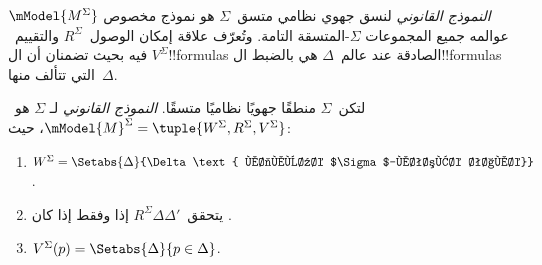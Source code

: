 \documentclass[../../../include/open-logic-section]{subfiles}
\begin{document}


\emph{النموذج القانوني} لنسق جهوي نظامي متسق~$\Sigma$ هو نموذج مخصوص
$\mModel{M^\Sigma}$ عوالمه جميع المجموعات $\Sigma$-المتسقة التامة.
وتُعرّف علاقة إمكان الوصول~$R^\Sigma$ والتقييم~$V^\Sigma$ فيه بحيث
تضمنان أن ال!!{formula}s الصادقة عند عالم~$\Delta$ هي بالضبط
ال!!{formula}s التي تتألف منها~$\Delta$.

\begin{defn}
  لتكن~$\Sigma$ منطقًا جهويًا نظاميًا متسقًا. \emph{النموذج القانوني} لـ
  $\Sigma$ هو~$\mModel{M}^\Sigma = \tuple{W^\Sigma, R^\Sigma,
    V^\Sigma}$، حيث:
  \begin{enumerate}
  \item $W^\Sigma = \Setabs{\Delta}{\Delta \text{ مجموعة
      $\Sigma$-متسقة تامة}}$.
  \item يتحقق~$R^\Sigma \Delta\Delta'$ إذا وفقط إذا كان
    .
  \item $V^\Sigma(p) = \Setabs{\Delta}{p \in \Delta}$.
  \end{enumerate}
\end{defn}
\end{document}

